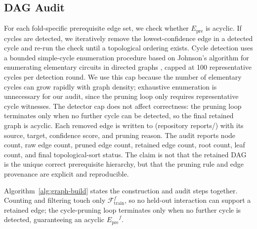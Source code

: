 \documentclass[pdflatex,sn-mathphys-num]{sn-jnl}
\newcommand{\Epre}{\ensuremath{E_{\text{pre}}}}
\begin{document}
\subsection{DAG Audit}
\label{sec:dag-audit}
For each fold-specific prerequisite edge set, we check whether $\Epre$
is acyclic. If cycles are detected, we iteratively remove the
lowest-confidence edge in a detected cycle and re-run the check until a
topological ordering exists. Cycle detection uses a bounded simple-cycle enumeration procedure based on
Johnson's algorithm for enumerating elementary circuits in directed graphs \cite{johnson1975finding}, capped at 100 representative cycles per detection round. We use this cap because the number of elementary cycles can grow rapidly with graph density; exhaustive enumeration is unnecessary for our
audit, since the pruning loop only requires representative cycle witnesses. The detector cap does not affect
correctness: the pruning loop terminates only when no further cycle can
be detected, so the final retained graph is acyclic. Each removed edge
is written to
 (repository reports/) with its source,
target, confidence score, and pruning reason. The audit reports node
count, raw edge count, pruned edge count, retained edge count, root
count, leaf count, and final topological-sort status. The claim is not
that the retained DAG is the unique correct prerequisite hierarchy, but
that the pruning rule and edge provenance are explicit and reproducible.

Algorithm~\ref{alg:graph-build} states the construction and audit steps
together. Counting and filtering touch only $\mathcal{F}^f_{\text{train}}$,
so no held-out interaction can support a retained edge; the cycle-pruning loop
terminates only when no further cycle is detected, guaranteeing an acyclic
$\Epre^f$.
\end{document}

